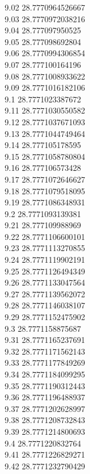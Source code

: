 {9.02	28.7770964526667\\
9.03	28.7770972038216\\
9.04	28.777097950525\\
9.05	28.777098692804\\
9.06	28.7770994306854\\
9.07	28.777100164196\\
9.08	28.7771008933622\\
9.09	28.7771016182106\\
9.1	28.7771023387672\\
9.11	28.7771030550582\\
9.12	28.7771037671093\\
9.13	28.7771044749464\\
9.14	28.777105178595\\
9.15	28.7771058780804\\
9.16	28.777106573428\\
9.17	28.7771072646627\\
9.18	28.7771079518095\\
9.19	28.7771086348931\\
9.2	28.7771093139381\\
9.21	28.777109988969\\
9.22	28.7771106600101\\
9.23	28.7771113270855\\
9.24	28.7771119902191\\
9.25	28.7771126494349\\
9.26	28.7771133047564\\
9.27	28.7771139562072\\
9.28	28.7771146038107\\
9.29	28.7771152475902\\
9.3	28.7771158875687\\
9.31	28.7771165237691\\
9.32	28.7771171562143\\
9.33	28.7771177849269\\
9.34	28.7771184099295\\
9.35	28.7771190312443\\
9.36	28.7771196488937\\
9.37	28.7771202628997\\
9.38	28.7771208732843\\
9.39	28.7771214800693\\
9.4	28.7771220832764\\
9.41	28.7771226829271\\
9.42	28.7771232790429\\
}
